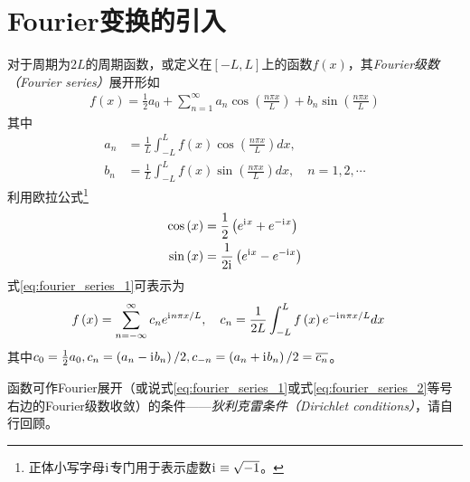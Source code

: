 \documentclass[main.tex]{subfiles}
\begin{document}
\section{Fourier变换的引入}
对于周期为$2L$的周期函数，或定义在$\left[-L,L\right]$上的函数$f\left(x\right)$，其\emph{Fourier级数（Fourier series）}展开\cite[\S 11.5, \S 11.6]{华工高数2009下}形如
\begin{align}\label{eq:fourier_series_1}
    f\left(x\right)=\frac{1}{2}a_0+\sum_{n=1}^\infty a_n\cos\left(\frac{n\pi x}{L}\right)+b_n\sin\left(\frac{n\pi x}{L}\right)
\end{align}
其中
\begin{align*}
    a_n & =\frac{1}{L}\int_{-L}^L f\left(x\right)\cos\left(\frac{n\pi x}{L}\right)dx,                   \\
    b_n & =\frac{1}{L}\int_{-L}^L f\left(x\right)\sin\left(\frac{n\pi x}{L}\right)dx,\quad n=1,2,\cdots
\end{align*}
利用欧拉公式\footnote{正体小写字母$\mathrm{i}\mkern1mu$专门用于表示虚数$\mathrm{i}\mkern1mu\equiv\sqrt{-1}$。}
\begin{align*}
    \cos\left(x\right) & =\frac{1}{2}\left(e^{\mathrm{i}\mkern1mu x}+e^{-\mathrm{i}\mkern1mu x}\right)   \\
    \sin\left(x\right) & =\frac{1}{2\mathrm{i}\mkern1mu}\left(e^{\mathrm{i}\mkern1mu x}-e^{-\mathrm{i}\mkern1mu x}\right)
\end{align*}
式\eqref{eq:fourier_series_1}可表示为
\begin{align}\label{eq:fourier_series_2}
    f\left(x\right) & =\sum_{n=-\infty}^{\infty}c_ne^{\mathrm{i}\mkern1mu n\pi x/L},\quad c_n=\frac{1}{2L}\int_{-L}^Lf\left(x\right)e^{-\mathrm{i}\mkern1mu n\pi x/L}dx
\end{align}
其中$c_0=\frac{1}{2}a_0,c_n=\left(a_n-\mathrm{i}\mkern1mu b_n\right)/2,c_{-n}=\left(a_n+\mathrm{i}\mkern1mu b_n\right)/2=\overline{c_n}$。

函数可作Fourier展开（或说式\eqref{eq:fourier_series_1}或式\eqref{eq:fourier_series_2}等号右边的Fourier级数收敛）的条件——\emph{狄利克雷条件（Dirichlet conditions）}，请自行回顾\cite[定理11.6.1，p.301]{华工高数2009下}。
\end{document}
